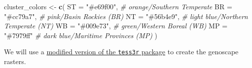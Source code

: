 \documentclass[
]{book}
\newenvironment{Shaded}{\begin{snugshade}}{\end{snugshade}}
\newcommand{\AttributeTok}[1]{\textcolor[rgb]{0.13,0.29,0.53}{#1}}
\newcommand{\CommentTok}[1]{\textcolor[rgb]{0.56,0.35,0.01}{\textit{#1}}}
\newcommand{\FunctionTok}[1]{\textcolor[rgb]{0.13,0.29,0.53}{\textbf{#1}}}
\newcommand{\NormalTok}[1]{#1}
\newcommand{\OtherTok}[1]{\textcolor[rgb]{0.56,0.35,0.01}{#1}}
\newcommand{\StringTok}[1]{\textcolor[rgb]{0.31,0.60,0.02}{#1}}
\begin{document}
\begin{Shaded}
\begin{Highlighting}[]
\NormalTok{cluster\_colors }\OtherTok{\textless{}{-}}  \FunctionTok{c}\NormalTok{(}
  \StringTok{\textasciigrave{}}\AttributeTok{ST}\StringTok{\textasciigrave{}} \OtherTok{=} \StringTok{"\#e69f00"}\NormalTok{, }\CommentTok{\# orange/Southern Temperate}
  \StringTok{\textasciigrave{}}\AttributeTok{BR}\StringTok{\textasciigrave{}} \OtherTok{=} \StringTok{"\#cc79a7"}\NormalTok{, }\CommentTok{\# pink/Basin Rockies (BR)}
  \StringTok{\textasciigrave{}}\AttributeTok{NT}\StringTok{\textasciigrave{}} \OtherTok{=} \StringTok{"\#56b4e9"}\NormalTok{, }\CommentTok{\# light blue/Northern Temperate (NT)}
  \StringTok{\textasciigrave{}}\AttributeTok{WB}\StringTok{\textasciigrave{}} \OtherTok{=} \StringTok{"\#009e73"}\NormalTok{, }\CommentTok{\# green/Western Boreal (WB)}
  \StringTok{\textasciigrave{}}\AttributeTok{MP}\StringTok{\textasciigrave{}} \OtherTok{=} \StringTok{"\#7979ff"} \CommentTok{\# dark blue/Maritime Provinces (MP)}
\NormalTok{) }
\end{Highlighting}
\end{Shaded}

We will use a \href{https://github.com/eriqande/TESS3_encho_sen}{modified version of the \texttt{tess3r} package} to create the genoscape rasters.
\end{document}
